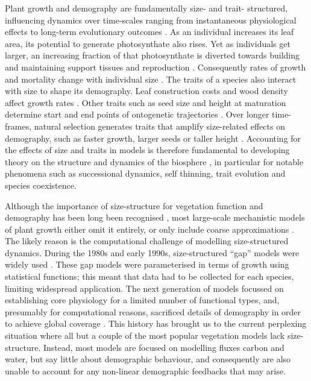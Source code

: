 \documentclass[a4paper,11pt]{article}
\begin{document}
Plant growth and demography are fundamentally size- and trait- structured,
influencing dynamics over time-scales ranging from instantaneous physiological
effects to long-term evolutionary outcomes \citep{Harper-1977, Westoby-2002}. As
an individual increases its leaf area, its potential to generate
photosynthate also rises. Yet as individuals get larger, an increasing
fraction of that photosynthate is diverted towards
building and maintaining support tissues
\citep{Givnish-1988, Enquist-2007} and reproduction \citep{Thomas-2011}. Consequently 
rates of growth and mortality change with individual size
\citep{Muller-2006, Thomas-2011, Ruger-2011, Wright-2010}. The traits of
a species also interact with size to shape its demography. Leaf
construction costs and wood density affect growth rates
\citep{Wright-2010}. Other traits such as seed size and height at
maturation determine start and end points of ontogenetic trajectories
\citep{Westoby-2002}. Over longer time-frames, natural selection generates
traits that amplify size-related effects on demography,
such as faster growth, larger seeds or taller height \citep{Falster-2003}. 
Accounting for the effects of size and traits in models is therefore fundamental to developing theory on the structure and dynamics of the biosphere
\citep{Purves-2008, Moorcroft-2001, Falster-2003}, in particular for notable
phenomena such as successional dynamics, self thinning, trait evolution
and species coexistence.

Although the importance of size-structure for vegetation function and
demography has been long been recognised
\citep{Harper-1977, Hara-1984, Shugart-1980, Huston-1987, Moorcroft-2001,
Kohyama-1993, Enquist-2007, Pacala-1996, Coomes-2007},
most large-scale mechanistic models of plant growth either omit it
entirely, or only include coarse approximations
\citep{Cramer-2001, Dekauwe-2014, Kelley-2013, Sitch-2003}. The likely
reason is the computational
challenge of modelling size-structured dynamics. During the 1980s and
early 1990s, size-structured ``gap'' models were widely used
\citep[e.g.][]{Huston-1987, Shugart-1980}. These gap models were
parameterised in terms of growth using statistical functions; this meant 
that data had to be collected for each species, limiting widespread application. 
The next generation of models focussed on establishing core physiology for 
a limited number of functional types, and, presumably for computational reasons,
sacrificed details of demography in order to achieve global coverage
\citep{Haxeltine-1996,Woodward-1995}. This history has brought us to the
current perplexing situation where all but a couple
\citep[e.g.][]{Moorcroft-2001, Smith-2014} of the most popular vegetation
models lack size-structure. Instead, most models
are focused on modelling fluxes carbon and water, but say little about
demographic behaviour, and consequently are also unable to account for
any non-linear demographic feedbacks that may arise.
\end{document}
